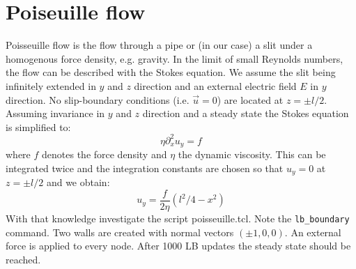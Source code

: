 \section{Poiseuille flow \ES{}}
Poisseuille flow is the flow through a pipe or (in our case) a slit
under a homogenous force density, e.g. gravity. In the limit of small Reynolds
numbers, the flow can be described with the Stokes equation. 
We assume the slit being infinitely extended in $y$ and $z$ 
direction and an external electric field $E$
in $y$ direction. No slip-boundary conditions  (i.e. $\vec{u}=0$)
are located at $z = \pm l/2$.
Assuming invariance in $y$ and $z$ direction and a steady state 
the Stokes equation is simplified to:
\begin{equation}
  \eta \partial_x^2 u_y = f
\end{equation}
where $f$ denotes the force density and $\eta$ the dynamic viscosity.
This can be integrated twice and the integration constants are chosen
so that $u_y=0$ at $z = \pm l/2$ and we obtain:
\begin{equation}
  u_y = \frac{f}{2\eta} \left(l^2/4-x^2\right)
\end{equation}
With that knowledge investigate the script poisseuille.tcl.
Note the \lstinline{lb_boundary} command. Two walls are created
with normal vectors $\left(\pm 1, 0, 0 \right)$. An external force
is applied to every node. After 1000 LB updates the steady state should
be reached.

